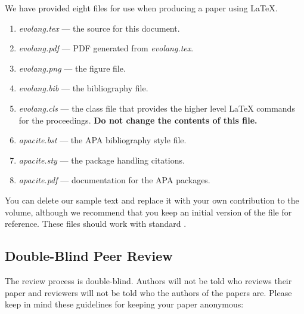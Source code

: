 \documentclass{evolang}
\begin{document}
We have provided eight files for use when producing a paper using \LaTeX{}. 

\begin{enumerate}

\item {\em evolang.tex} --- the source for this document. 

\item {\em evolang.pdf} --- PDF generated from {\em evolang.tex}.

\item {\em evolang.png} --- the figure file.

\item {\em evolang.bib} --- the bibliography file.

\item {\em evolang.cls} --- the class file that provides the higher
level \LaTeX{} commands for the proceedings. \textbf{Do not change the contents of this file.}
 
\item {\em apacite.bst} --- the APA bibliography style file.
  
\item {\em apacite.sty} --- the package handling citations.

\item {\em apacite.pdf} --- documentation for the APA packages.

\end{enumerate}

You can delete our sample text and replace it with your own
contribution to the volume, although we recommend that you keep an initial version of the file for reference.  These files should work with standard \LaTeXe{}.

\subsection{Double-Blind Peer Review}

The review process is double-blind.  Authors will not be told who reviews their paper and reviewers will not be told who the authors of the papers are.  Please keep in mind these guidelines for keeping your paper anonymous:
\end{document}
